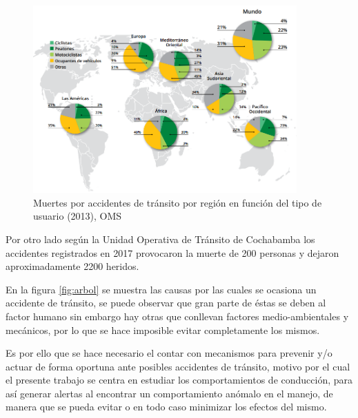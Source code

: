 \begin{figure}[h!]
  \begin{center}	\includegraphics[width=0.9\textwidth]{imagenes/oms1}
  \caption{Muertes por accidentes de tránsito por regi\'{o}n en función del tipo de usuario (2013), OMS}
  \label{fig:oms}  
  \end{center}
\end{figure}

Por otro lado seg\'{u}n la Unidad Operativa de Tr\'{a}nsito de Cochabamba los accidentes registrados en 2017 provocaron la muerte de 200 personas y dejaron aproximadamente 2200 heridos.
	
\vspace{5mm} %

En la figura \ref{fig:arbol} se muestra las causas por las cuales se ocasiona un accidente de tr\'{a}nsito, se puede observar que gran parte de \'{e}stas se deben al factor humano sin embargo hay otras que conllevan factores medio-ambientales y mec\'{a}nicos, por lo que se hace imposible evitar completamente los mismos. 

\vspace{5mm} %

Es por ello que se hace necesario el contar con mecanismos para prevenir y/o actuar de forma oportuna ante posibles accidentes de tr\'{a}nsito, motivo por el cual el presente trabajo se centra en estudiar los comportamientos de conducci\'{o}n, para as\'{i} generar alertas al encontrar un comportamiento an\'{o}malo en el manejo, de manera que se pueda evitar o en todo caso minimizar los efectos del mismo.

